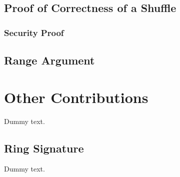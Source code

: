             

    \section{Proof of Correctness of a Shuffle}

        

        \subsection{Security Proof}

            

    \section{Range Argument}

        

\chapter{Other Contributions}

    Dummy text.

    \section{Ring Signature}

Dummy text.
